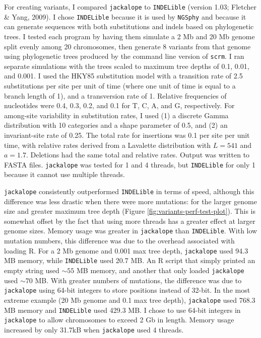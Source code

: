 \documentclass[12pt,]{article}
\begin{document}
For creating variants, I compared \texttt{jackalope} to \texttt{INDELible}
(version 1.03; Fletcher \& Yang, 2009).
I chose \texttt{INDELible} because it is used by \texttt{NGSphy} and because it can generate
sequences with both substitutions and indels based on phylogenetic trees.
I tested each program by having them simulate a 2 Mb and 20 Mb genome
split evenly among 20 chromosomes, then generate 8 variants from that genome using
phylogenetic trees produced by the command line version of \texttt{scrm}.
I ran separate simulations with the trees scaled to maximum tree depths of 0.1, 0.01,
and 0.001.
I used the HKY85 substitution model with a transition rate of 2.5 substitutions per
site per unit of time (where one unit of time is equal to a branch length of 1),
and a transversion rate of 1.
Relative frequencies of nucleotides were 0.4, 0.3, 0.2, and 0.1 for T, C, A, and G,
respectively.
For among-site variability in substitution rates, I used
(1) a discrete Gamma distribution with 10 categories and a shape parameter of 0.5, and
(2) an invariant-site rate of 0.25.
The total rate for insertions was 0.1 per site per unit time,
with relative rates derived from a Lavalette distribution with \(L = 541\) and \(a = 1.7\).
Deletions had the same total and relative rates.
Output was written to FASTA files.
\texttt{jackalope} was tested for 1 and 4 threads, but
\texttt{INDELible} for only 1 because it cannot use multiple threads.

\texttt{jackalope} consistently outperformed \texttt{INDELible} in terms of speed, although this
difference was less drastic when there were more mutations: for the larger genome size
and greater maximum tree depth (Figure \ref{fig:variants-perf-test-plot}).
This is somewhat offset by the fact that using more threads has a greater effect at
larger genome sizes.
Memory usage was greater in \texttt{jackalope} than \texttt{INDELible}.
With low mutation numbers, this difference was due to the overhead associated
with loading R.
For a 2 Mb genome and 0.001 max tree depth, \texttt{jackalope} used
94.3 MB memory,
while \texttt{INDELible} used 20.7 MB.
An R script that simply printed an empty string used \(\sim 55\) MB memory,
and another that only loaded \texttt{jackalope} used \(\sim 70\) MB.
With greater numbers of mutations, the difference was due to \texttt{jackalope} using
64-bit integers to store positions instead of 32-bit.
In the most extreme example (20 Mb genome and 0.1 max tree depth), \texttt{jackalope} used
768.3 MB memory and \texttt{INDELible} used
429.3 MB.
I chose to use 64-bit integers in \texttt{jackalope} to allow chromosomes to exceed
2 Gb in length.
Memory usage increased by only 31.7kB when
\texttt{jackalope} used 4 threads.
\end{document}
